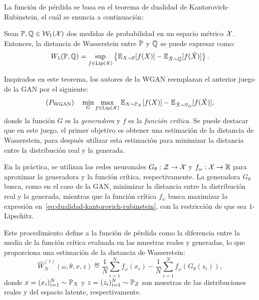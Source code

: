 La función de pérdida se basa en el teorema de dualidad de Kantorovich-Rubinstein, el cuál se enuncia a continuación:
\begin{theorem}\label{thm:dualidad-kantorovich-rubinstein}
	Sean $\Prob, \ProbQ \in \WassersteinSpace[1]{\cX}$ dos medidas de probabilidad en un espacio métrico $\mathcal{X}$. Entonces, la distancia de Wasserstein entre $\Prob$ y $\ProbQ$ se puede expresar como:
	\begin{equation}\label{eq:dualidad-kantorovich-rubinstein}
		\Wasserstein[1]{\Prob}{\ProbQ} = \sup_{f \in \Lip[\cX]} \left\{ \Exp_{X\sim \Prob} [f(X)] - \Exp_{\tilde X \sim \ProbQ} [f(\tilde X)] \right\}.
	\end{equation}
\end{theorem}

Inspirados en este teorema, los autores de la WGAN \cite{arjovsky2017wasserstein} reemplazan el anterior juego de la GAN por el siguiente:
\begin{equation}\label{eq:wgan-game}
	(P_{\mathrm{WGAN}}) \quad \min_{G} \max_{f \in \Lip[\cX]} \Exp_{X\sim \Prob_X} [f(X)] - \Exp_{\tilde X \sim \Prob_G} [f(\tilde X)],
\end{equation}
donde la función $G$ es la \textit{generadora} y $f$ es la \textit{función crítica}. Se puede destacar que en este juego, el primer objetivo es obtener una estimación de la distancia de Wasserstein, para después utilizar esta estimación para minimizar la distancia entre la distribución real y la generada.

En la práctica, se utilizan las redes neuronales $G_\theta: \mathcal{Z} \to \mathcal{X}$ y $f_\omega: \mathcal{X} \to \mathbb{R}$ para aproximar la generadora y la función crítica, respectivamente.
La generadora $G_\theta$ busca, como en el caso de la GAN, minimizar la distancia entre la distribución real y la generada, mientras que la función crítica $f_\omega$ busca maximizar la expresión en~\eqref{eq:dualidad-kantorovich-rubinstein}, con la restricción de que sea $1$-Lipschitz.

Este procedimiento define a la función de pérdida como
la diferencia entre la media de la función crítica evaluada en las muestras reales y generadas, lo que proporciona una estimación de la distancia de Wasserstein:
\begin{equation}\label{eq:wasserstein-estimation}
	\widehat W_N^{(1)} (
	\omega, \theta, x, z
	)
	\eqdef \frac{1}{N}\sum_{i=1}^{N} f_\omega(x_i) - \frac{1}{N}\sum_{i=1}^{N} f_\omega(G_\theta(z_i)),
\end{equation}
donde $x = (x_i)_{i=1}^{N} \sim \Prob_X$ y $z = (z_i)_{i=1}^{N} \sim \Prob_Z$ son muestras de las distribuciones reales y del espacio latente, respectivamente.

